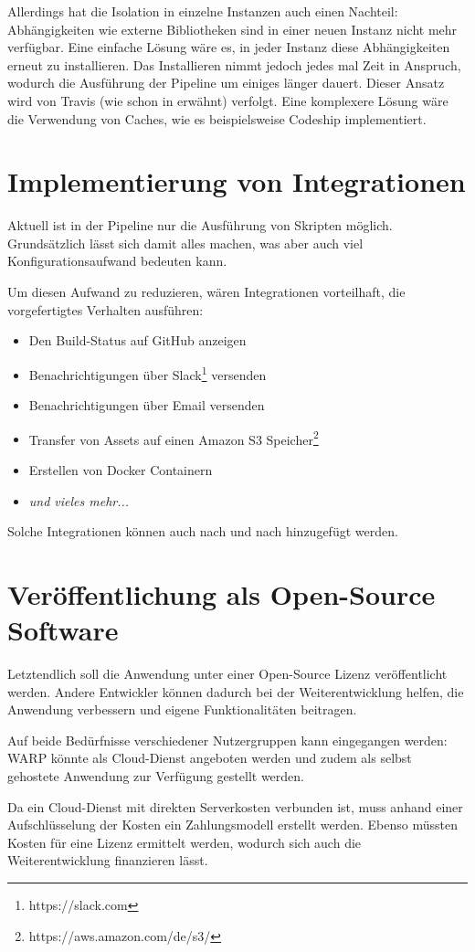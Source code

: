 Allerdings hat die Isolation in einzelne Instanzen auch einen Nachteil: Ab\-häng\-ig\-kei\-ten wie externe Bibliotheken sind in einer neuen Instanz nicht mehr verfügbar. Eine einfache Lösung wäre es, in jeder Instanz diese Abhängigkeiten erneut zu installieren. Das Installieren nimmt jedoch jedes mal Zeit in Anspruch, wodurch die Ausführung der Pipeline um einiges länger dauert. Dieser Ansatz wird von Travis (wie schon in  erwähnt) verfolgt. Eine komplexere Lösung wäre die Verwendung von Caches, wie es beispielsweise Codeship implementiert.


\section{Implementierung von Integrationen}

Aktuell ist in der Pipeline nur die Ausführung von Skripten möglich. Grundsätzlich lässt sich damit alles machen, was aber auch viel Konfigurationsaufwand bedeuten kann.

Um diesen Aufwand zu reduzieren, wären Integrationen vorteilhaft, die vorgefertigtes Verhalten ausführen:

\begin{itemize}
  \item Den Build-Status auf GitHub anzeigen
  \item Benachrichtigungen über Slack\footnote{https://slack.com} versenden
  \item Benachrichtigungen über Email versenden
  \item Transfer von Assets auf einen Amazon S3 Speicher\footnote{https://aws.amazon.com/de/s3/}
  \item Erstellen von Docker Containern
  \item \emph{und vieles mehr...}
\end{itemize}

Solche Integrationen können auch nach und nach hinzugefügt werden.

\section{Veröffentlichung als Open-Source Software}

Letztendlich soll die Anwendung unter einer Open-Source Lizenz veröffentlicht werden. Andere Entwickler können dadurch bei der Weiterentwicklung helfen, die Anwendung verbessern und eigene Funktionalitäten beitragen.

Auf beide Bedürfnisse verschiedener Nutzergruppen kann eingegangen werden: WARP könnte als Cloud-Dienst angeboten werden und zudem als selbst gehostete Anwendung zur Verfügung gestellt werden.

Da ein Cloud-Dienst mit direkten Serverkosten verbunden ist, muss anhand einer Aufschlüsselung der Kosten ein Zahlungsmodell erstellt werden. Ebenso müssten Kosten für eine Lizenz ermittelt werden, wodurch sich auch die Weiterentwicklung finanzieren lässt.
